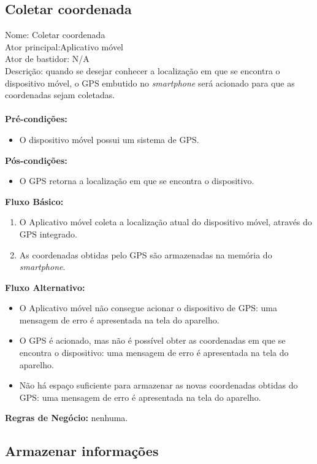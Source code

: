 \subsection{Coletar coordenada }

\noindent Nome: Coletar coordenada\\
Ator principal:Aplicativo móvel\\
Ator de bastidor: N/A\\
Descrição: quando se desejar conhecer a localização em que se encontra o dispositivo móvel, o GPS embutido no \textit{smartphone} será acionado para que as coordenadas sejam coletadas. \\\\
\textbf{Pré-condições:}
	\begin{itemize}
		\item O dispositivo móvel possui um sistema de GPS.
	\end{itemize}
\textbf{Pós-condições:}
	\begin{itemize}
		\item O GPS retorna a localização em que se encontra o dispositivo.
	\end{itemize}	
\textbf{Fluxo Básico:}
	\begin{enumerate}
		\item O Aplicativo móvel coleta a localização atual do dispositivo móvel, através do GPS integrado.
		\item As coordenadas obtidas pelo GPS são armazenadas na memória do \textit{smartphone}.
	\end{enumerate}	
\textbf{Fluxo Alternativo:}
	\begin{itemize}
		\item O Aplicativo móvel não consegue acionar o dispositivo de GPS: uma mensagem de erro é apresentada na tela do aparelho.
		\item O GPS é acionado, mas não é possível obter as coordenadas em que se encontra o dispositivo: uma mensagem de erro é apresentada na tela do aparelho.
		\item Não há espaço suficiente para armazenar as novas coordenadas obtidas do GPS: uma mensagem de erro é apresentada na tela do aparelho.
	\end{itemize}
\textbf{Regras de Negócio:}	nenhuma.
\subsection{Armazenar informações }

